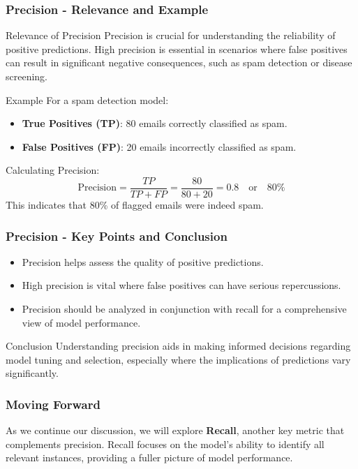 \documentclass[aspectratio=169]{beamer}
\begin{document}
\begin{frame}[fragile]
    \frametitle{Precision - Relevance and Example}
    \begin{block}{Relevance of Precision}
        Precision is crucial for understanding the reliability of positive predictions. High precision is essential in scenarios where false positives can result in significant negative consequences, such as spam detection or disease screening.
    \end{block}

    \begin{block}{Example}
        For a spam detection model:
        \begin{itemize}
            \item \textbf{True Positives (TP)}: 80 emails correctly classified as spam.
            \item \textbf{False Positives (FP)}: 20 emails incorrectly classified as spam.
        \end{itemize}
        Calculating Precision:
        \[
        \text{Precision} = \frac{TP}{TP + FP} = \frac{80}{80 + 20} = 0.8 \quad \text{or} \quad 80\%
        \]
        This indicates that 80\% of flagged emails were indeed spam.
    \end{block}
\end{frame}

\begin{frame}[fragile]
    \frametitle{Precision - Key Points and Conclusion}
    \begin{itemize}
        \item Precision helps assess the quality of positive predictions.
        \item High precision is vital where false positives can have serious repercussions.
        \item Precision should be analyzed in conjunction with recall for a comprehensive view of model performance.
    \end{itemize}

    \begin{block}{Conclusion}
        Understanding precision aids in making informed decisions regarding model tuning and selection, especially where the implications of predictions vary significantly.
    \end{block}
\end{frame}

\begin{frame}[fragile]
    \frametitle{Moving Forward}
    As we continue our discussion, we will explore \textbf{Recall}, another key metric that complements precision. Recall focuses on the model's ability to identify all relevant instances, providing a fuller picture of model performance.
\end{frame}
\end{document}
